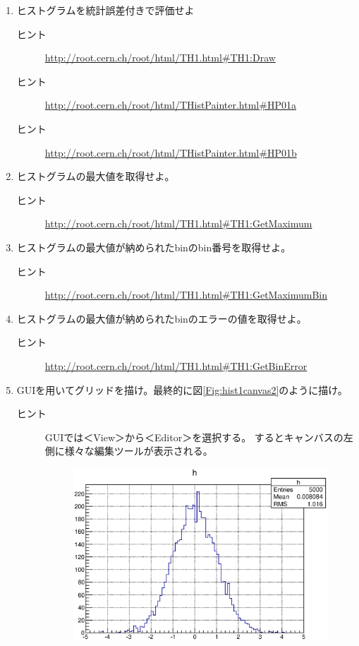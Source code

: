  \begin{enumerate}
   \item ヒストグラムを統計誤差付きで評価せよ
	 \begin{description}
	  \item[ヒント] \url{http://root.cern.ch/root/html/TH1.html#TH1:Draw}
	  \item[ヒント] \url{http://root.cern.ch/root/html/THistPainter.html#HP01a}
	  \item[ヒント] \url{http://root.cern.ch/root/html/THistPainter.html#HP01b}
	 \end{description}
   \item ヒストグラムの最大値を取得せよ。
	 \begin{description}
	  \item[ヒント] \url{http://root.cern.ch/root/html/TH1.html#TH1:GetMaximum}
	 \end{description}
   \item ヒストグラムの最大値が納められたbinのbin番号を取得せよ。
	 \begin{description}
	  \item[ヒント] \url{http://root.cern.ch/root/html/TH1.html#TH1:GetMaximumBin}
	 \end{description}
   \item ヒストグラムの最大値が納められたbinのエラーの値を取得せよ。
	 \begin{description}
	  \item[ヒント] \url{http://root.cern.ch/root/html/TH1.html#TH1:GetBinError}
	 \end{description}
   \item GUIを用いてグリッドを描け。最終的に図\ref{Fig:hist1canvas2}のように描け。
	 \begin{description}
	  \item[ヒント] GUIでは＜View＞から＜Editor＞を選択する。
		     するとキャンバスの左側に様々な編集ツールが表示される。
		     \begin{figure}[htbp]
		      \begin{center}
		       \includegraphics[width = 100mm]{./picture/hist1canvas2.eps}

\end{center}
\end{figure}
\end{description}
\end{enumerate}
